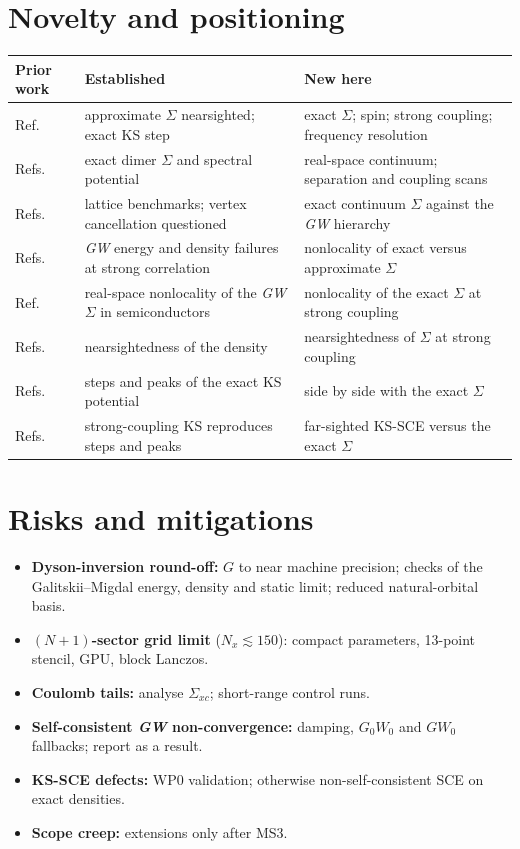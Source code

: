 \documentclass[11pt,a4paper]{article}
\newcommand{\GW}{\textit{GW}}
\begin{document}
\section{Novelty and positioning}
\begin{table}[h]
\centering\small
\begin{tabularx}{\textwidth}{@{}YYY@{}}
\toprule
Prior work & Established & New here\\
\midrule
Ref.~\cite{wetherell2019} & approximate $\Sigma$ nearsighted; exact KS step & exact $\Sigma$; spin; strong coupling; frequency resolution\\
Refs.~\cite{romaniello2009,vanzini2018} & exact dimer $\Sigma$ and spectral potential & real-space continuum; separation and coupling scans\\
Refs.~\cite{exthubbard2026,forster2024} & lattice benchmarks; vertex cancellation questioned & exact continuum $\Sigma$ against the \GW{} hierarchy\\
Refs.~\cite{caruso2013,hellgren2015,loos2018} & \GW{} energy and density failures at strong correlation & nonlocality of exact versus approximate $\Sigma$\\
Ref.~\cite{godby1988} & real-space nonlocality of the \GW{} $\Sigma$ in semiconductors & nonlocality of the exact $\Sigma$ at strong coupling\\
Refs.~\cite{kohn1996,prodan2005} & nearsightedness of the density & nearsightedness of $\Sigma$ at strong coupling\\
Refs.~\cite{buijse1989,helbig2009,hodgson2016,hodgson2017,kraisler2021} & steps and peaks of the exact KS potential & side by side with the exact $\Sigma$\\
Refs.~\cite{malet2012,mirtschink2013,giarrusso2024} & strong-coupling KS reproduces steps and peaks & far-sighted KS-SCE versus the exact $\Sigma$\\
\bottomrule
\end{tabularx}
\end{table}

\section{Risks and mitigations}
\begin{itemize}
\item \textbf{Dyson-inversion round-off:} $G$ to near machine precision; checks of the Galitskii--Migdal energy, density and static limit; reduced natural-orbital basis.
\item \textbf{$(N+1)$-sector grid limit} ($N_x\lesssim150$): compact parameters, 13-point stencil, GPU, block Lanczos.
\item \textbf{Coulomb tails:} analyse $\Sigma_{xc}$; short-range control runs.
\item \textbf{Self-consistent \GW{} non-convergence:} damping, $G_0W_0$ and $GW_0$ fallbacks; report as a result.
\item \textbf{KS-SCE defects:} WP0 validation; otherwise non-self-consistent SCE on exact densities.
\item \textbf{Scope creep:} extensions only after MS3.
\end{itemize}
\end{document}

